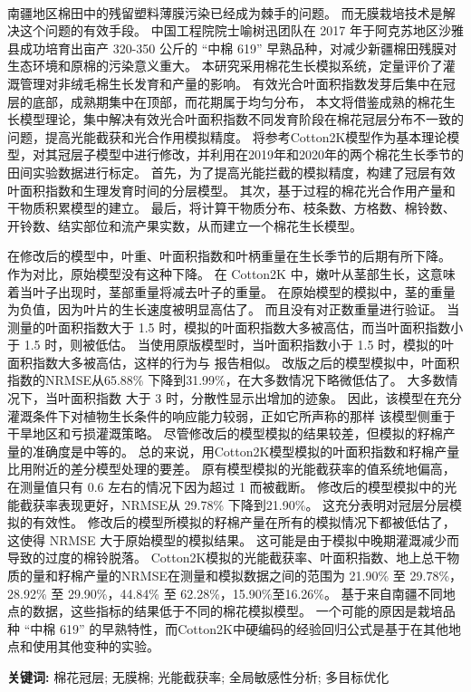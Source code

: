 \begin{doublespace}
    \begin{center}
    \textbf{\songti{\titleCN}}\\
    \end{center}
\end{doublespace}
\begin{spacing}{}
南疆地区棉田中的残留塑料薄膜污染已经成为棘手的问题。%
而无膜栽培技术是解决这个问题的有效手段。%
中国工程院院士喻树迅团队在 2017 年于阿克苏地区沙雅县成功培育出亩产 320{-}350 公斤的 “中棉 619” 早熟品种，对减少新疆棉田残膜对生态环境和原棉的污染意义重大。%
本研究采用棉花生长模拟系统，定量评价了灌溉管理对非绒毛棉生长发育和产量的影响。%
有效光合叶面积指数发芽后集中在冠层的底部，成熟期集中在顶部，而花期属于均匀分布，%
本文将借鉴成熟的棉花生长模型理论，集中解决有效光合叶面积指数不同发育阶段在棉花冠层分布不一致的问题，提高光能截获和光合作用模拟精度。
将参考Cotton2K模型作为基本理论模型，对其冠层子模型中进行修改，并利用在2019年和2020年的两个棉花生长季节的田间实验数据进行标定。
首先，为了提高光能拦截的模拟精度，构建了冠层有效叶面积指数和生理发育时间的分层模型。
其次，基于过程的棉花光合作用产量和干物质积累模型的建立。
最后，将计算干物质分布、枝条数、方格数、棉铃数、开铃数、结实部位和流产果实数，从而建立一个棉花生长模型。

在修改后的模型中，叶重、叶面积指数和叶柄重量在生长季节的后期有所下降。
作为对比，原始模型没有这种下降。
在 Cotton2K 中，嫩叶从茎部生长，这意味着当叶子出现时，茎部重量将减去叶子的重量。
在原始模型的模拟中，茎的重量为负值，因为叶片的生长速度被明显高估了。
而且没有对正数重量进行验证。
当测量的叶面积指数大于 1.5 时，模拟的叶面积指数大多被高估，而当叶面积指数小于 1.5 时，则被低估。
当使用原版模型时，当叶面积指数小于 1.5 时，模拟的叶面积指数大多被高估，这样的行为与  报告相似。
改版之后的模型模拟中，叶面积指数的NRMSE从65.88\% 下降到31.99\%，在大多数情况下略微低估了。
大多数情况下，当叶面积指数 大于 3 时，分散性显示出增加的迹象。
因此，该模型在充分灌溉条件下对植物生长条件的响应能力较弱，正如它所声称的那样
该模型侧重于干旱地区和亏损灌溉策略。
尽管修改后的模型模拟的结果较差，但模拟的籽棉产量的准确度是中等的。
总的来说，用Cotton2K模型模拟的叶面积指数和籽棉产量比用附近的差分模型处理的要差。
原有模型模拟的光能截获率的值系统地偏高，在测量值只有 0.6 左右的情况下因为超过 1 而被截断。
修改后的模型模拟中的光能截获率表现更好，NRMSE从 29.78\% 下降到21.90\%。
这充分表明对冠层分层模拟的有效性。
修改后的模型所模拟的籽棉产量在所有的模拟情况下都被低估了，
这使得 NRMSE 大于原始模型的模拟结果。
这可能是由于模拟中晚期灌溉减少而导致的过度的棉铃脱落。
Cotton2K模拟的光能截获率、叶面积指数、地上总干物质的量和籽棉产量的NRMSE在测量和模拟数据之间的范围为
21.90\% 至 29.78\%，28.92\% 至 29.90\%，44.84\% 至 62.28\%，15.90\%至16.26\%。
基于来自南疆不同地点的数据，这些指标的结果低于不同的棉花模拟模型。
一个可能的原因是栽培品种 “中棉 619” 的早熟特性，而Cotton2K中硬编码的经验回归公式是基于在其他地点和使用其他变种的实验。

\textbf{关键词:} 棉花冠层; 无膜棉; 光能截获率; 全局敏感性分析; 多目标优化
\end{spacing}
\newpage

